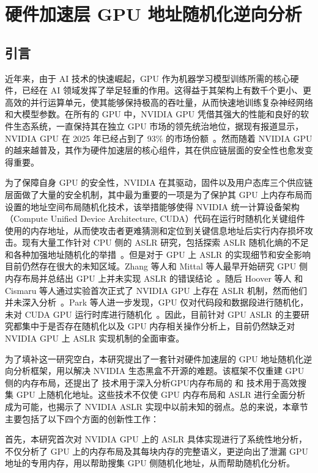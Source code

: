 \chapter{硬件加速层 GPU 地址随机化逆向分析}
\section{引言}
近年来，由于 AI 技术的快速崛起，GPU 作为机器学习模型训练所需的核心硬件，已经在 AI 领域发挥了举足轻重的作用。这得益于其架构上有数千个更小、更高效的并行运算单元，使其能够保持极高的吞吐量，从而快速地训练复杂神经网络和大模型参数。在所有的 GPU 中，NVIDIA GPU 凭借其强大的性能和良好的软件生态系统，一直保持其在独立 GPU 市场的领先统治地位，据现有报道显示，NVIDIA GPU 在 2025 年已经占到了 93\% 的市场份额~\cite{nv_gpu_share}。然而随着 NVIDIA GPU 的越来越普及，其作为硬件加速层的核心组件，其在供应链层面的安全性也愈发变得重要。

为了保障自身 GPU 的安全性，NVIDIA 在其驱动，固件以及用户态库三个供应链层面做了大量的安全机制，其中最为重要的一项是为了保护其 GPU 上内存布局而设置的地址空间布局随机化技术，该举措能够使得 NVIDIA 统一计算设备架构（Compute Unified Device Architecture, CUDA）代码在运行时随机化关键组件使用的内存地址，从而使攻击者更难猜测和定位到关键信息地址后实行内存损坏攻击。现有大量工作针对 CPU 侧的 ASLR 研究，包括探索 ASLR 随机化熵的不足和各种加强地址随机化的举措~\cite{binosi2024illusion,diaz2021address,tagbleed2020}。但是对于 GPU 上 ASLR 的实现细节和安全影响目前仍然存在很大的未知区域。Zhang 等人和 Mittal 等人最早开始研究 GPU 侧内存布局并总结出 GPU 上并未实现 ASLR 的错误结论~\cite{zhang2022lak,mittal2018survey}。随后 Hoover 等人 和 Cismaru 等人通过实验首次正式了 NVIDIA GPU 上存在 ASLR 机制，然而他们并未深入分析~\cite{hoover2022analysis,cismaru2023study}。Park 等人进一步发现，GPU 仅对代码段和数据段进行随机化，未对 CUDA GPU 运行时库进行随机化~\cite{park2020mind}。因此，目前针对 GPU ASLR 的主要研究都集中于是否存在随机化以及 GPU 内存相关操作分析上，目前仍然缺乏对 NVIDIA GPU 上 ASLR 实现机制的全面审查。

为了填补这一研究空白，本研究提出了一套针对硬件加速层的 GPU 地址随机化逆向分析框架，用以解决 NVIDIA 生态黑盒不开源的难题。该框架不仅重建 GPU 侧的内存布局，还提出了  技术用于深入分析GPU内存布局的 和  技术用于高效搜集 GPU 上随机化地址。这些技术不仅使 GPU 内存布局和 ASLR 进行全面分析成为可能，也揭示了 NVIDIA ASLR 实现中以前未知的弱点。总的来说，本章节主要包括了以下四个方面的创新性工作：

首先，本研究首次对 NVIDIA GPU 上的 ASLR 具体实现进行了系统性地分析，不仅分析了 GPU 上的内存布局及其每块内存的完整语义，更逆向出了泄漏 GPU 地址的专用内存，用以帮助搜集 GPU 侧随机化地址，从而帮助随机化分析。

